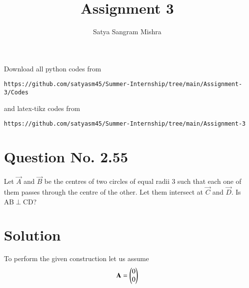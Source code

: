 \documentclass[journal,12pt,twocolumn]{IEEEtran}
\begin{document}
     \def\centbox#1{\makebox[0in]{#1}}
     \def\topbox#1{\raisebox{-\baselineskip}[0in][0in]{#1}}
     \def\midbox#1{\raisebox{-0.5\baselineskip}[0in][0in]{#1}}
\vspace{3cm}
\title{Assignment 3}
\author{Satya Sangram Mishra}
\maketitle
\newpage
\bigskip
\renewcommand{\thefigure}{\theenumi}
\renewcommand{\thetable}{\theenumi}
Download all python codes from 
\begin{lstlisting}
https://github.com/satyasm45/Summer-Internship/tree/main/Assignment-3/Codes
\end{lstlisting}
%
and latex-tikz codes from 
%
\begin{lstlisting}
https://github.com/satyasm45/Summer-Internship/tree/main/Assignment-3
\end{lstlisting}
%
\section{Question No. 2.55}
Let $\vec{A}$ and $\vec{B}$ be the centres of two circles
of equal radii 3 such that each one of them
passes through the centre of the other. Let them
intersect at $\vec{C}$ and $\vec{D}$. Is AB$\perp$CD?
%
\section{Solution}
To perform the given construction let us assume 
\begin{align}
\mathbf{A}=\begin{pmatrix}0\\0\end{pmatrix}
\end{align}
\end{document}
